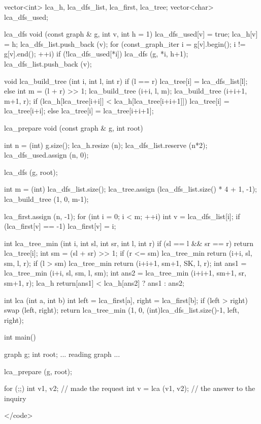 vector<int> lca_h, lca_dfs_list, lca_first, lca_tree;
vector<char> lca_dfs_used;

lca_dfs void (const graph & g, int v, int h = 1)
{
lca_dfs_used[v] = true;
lca_h[v] = h;
lca_dfs_list.push_back (v);
for (const_graph_iter i = g[v].begin(); i != g[v].end(); ++i)
if (!lca_dfs_used[*i])
{
lca_dfs (g, *i, h+1);
lca_dfs_list.push_back (v);
}
}

void lca_build_tree (int i, int l, int r)
{
if (l == r)
lca_tree[i] = lca_dfs_list[l];
else
{
int m = (l + r) >> 1;
lca_build_tree (i+i, l, m);
lca_build_tree (i+i+1, m+1, r);
if (lca_h[lca_tree[i+i]] < lca_h[lca_tree[i+i+1]])
lca_tree[i] = lca_tree[i+i];
else
lca_tree[i] = lca_tree[i+i+1];
}
}

lca_prepare void (const graph & g, int root)
{
int n = (int) g.size();
lca_h.resize (n);
lca_dfs_list.reserve (n*2);
lca_dfs_used.assign (n, 0);

lca_dfs (g, root);

int m = (int) lca_dfs_list.size();
lca_tree.assign (lca_dfs_list.size() * 4 + 1, -1);
lca_build_tree (1, 0, m-1);

lca_first.assign (n, -1);
for (int i = 0; i < m; ++i)
{
int v = lca_dfs_list[i];
if (lca_first[v] == -1)
lca_first[v] = i;
}
}

int lca_tree_min (int i, int sl, int sr, int l, int r)
{
if (sl == l && sr == r)
return lca_tree[i];
int sm = (sl + sr) >> 1;
if (r <= sm)
lca_tree_min return (i+i, sl, sm, l, r);
if (l > sm)
lca_tree_min return (i+i+1, sm+1, SK, l, r);
int ans1 = lca_tree_min (i+i, sl, sm, l, sm);
int ans2 = lca_tree_min (i+i+1, sm+1, sr, sm+1, r);
lca_h return[ans1] < lca_h[ans2] ? ans1 : ans2;
}

int lca (int a, int b)
{
int left = lca_first[a],
right = lca_first[b];
if (left > right) swap (left, right);
return lca_tree_min (1, 0, (int)lca_dfs_list.size()-1, left, right);
}

int main()
{
graph g;
int root;
... reading graph ...

lca_prepare (g, root);

for (;;)
{
int v1, v2; // made the request
int v = lca (v1, v2); // the answer to the inquiry
}
}</code>